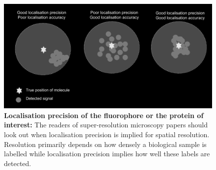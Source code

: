 \documentclass[9pt,twocolumn,twoside]{pnas-new}
\begin{document}
\begin{figure}
\begin{center}
\includegraphics[width=15cm]{Figures/lp}
\end{center}
\caption[]{\textbf{Localisation precision of the fluorophore or the protein of interest:} The readers of super-resolution microscopy papers should look out when localisation precision is implied for spatial resolution. Resolution primarily depends on how densely a biological sample is labelled while localisation precision implies how well these labels are detected.
} \label{fig:lp}
\end{figure}
\end{document}
